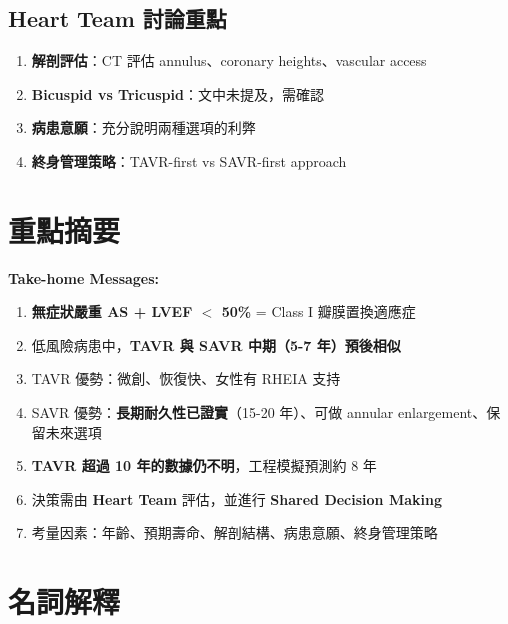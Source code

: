 \documentclass[12pt,a4paper]{article}
\begin{document}
\subsection{Heart Team 討論重點}

\begin{enumerate}[leftmargin=*]
    \item \textbf{解剖評估}：CT 評估 annulus、coronary heights、vascular access
    \item \textbf{Bicuspid vs Tricuspid}：文中未提及，需確認
    \item \textbf{病患意願}：充分說明兩種選項的利弊
    \item \textbf{終身管理策略}：TAVR-first vs SAVR-first approach
\end{enumerate}

\section{重點摘要}

\begin{importantbox}
\textbf{Take-home Messages:}
\begin{enumerate}[leftmargin=*]
    \item \textbf{無症狀嚴重 AS + LVEF $<$ 50\%} = Class I 瓣膜置換適應症
    \item 低風險病患中，\textbf{TAVR 與 SAVR 中期（5-7 年）預後相似}
    \item TAVR 優勢：微創、恢復快、女性有 RHEIA 支持
    \item SAVR 優勢：\textbf{長期耐久性已證實}（15-20 年）、可做 annular enlargement、保留未來選項
    \item \textbf{TAVR 超過 10 年的數據仍不明}，工程模擬預測約 8 年
    \item 決策需由 \textbf{Heart Team} 評估，並進行 \textbf{Shared Decision Making}
    \item 考量因素：年齡、預期壽命、解剖結構、病患意願、終身管理策略
\end{enumerate}
\end{importantbox}

\section{名詞解釋}
\end{document}
